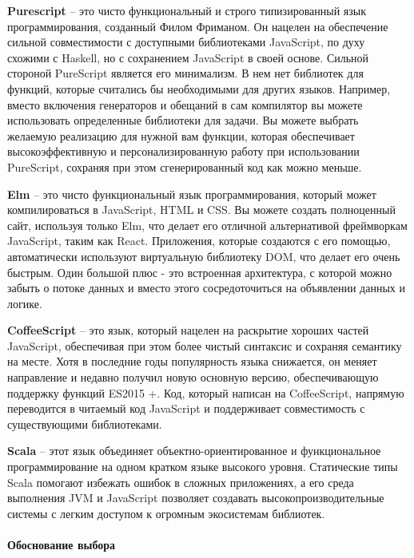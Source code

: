 \documentclass[a4paper,12pt,reqno]{article}
\begin{document}
\textbf{Purescript} -- это чисто функциональный и строго типизированный язык программирования, созданный Филом Фриманом. Он нацелен на обеспечение сильной совместимости с доступными библиотеками JavaScript, по духу схожими с Haskell, но с сохранением JavaScript в своей основе. Сильной стороной PureScript является его минимализм. В нем нет библиотек для функций, которые считались бы необходимыми для других языков. Например, вместо включения генераторов и обещаний в сам компилятор вы можете использовать определенные библиотеки для задачи. Вы можете выбрать желаемую реализацию для нужной вам функции, которая обеспечивает высокоэффективную и персонализированную работу при использовании PureScript, сохраняя при этом сгенерированный код как можно меньше.

\textbf{Elm} -- это чисто функциональный язык программирования, который может компилироваться в JavaScript, HTML и CSS. Вы можете создать полноценный сайт, используя только Elm, что делает его отличной альтернативой фреймворкам JavaScript, таким как React. Приложения, которые создаются с его помощью, автоматически используют виртуальную библиотеку DOM, что делает его очень быстрым. Один большой плюс - это встроенная архитектура, с которой можно забыть о потоке данных и вместо этого сосредоточиться на объявлении данных и логике.

\textbf{CoffeeScript} -- это язык, который нацелен на раскрытие хороших частей JavaScript, обеспечивая при этом более чистый синтаксис и сохраняя семантику на месте. Хотя в последние годы популярность языка снижается, он меняет направление и недавно получил новую основную версию, обеспечивающую поддержку функций ES2015 +. Код, который написан на CoffeeScript, напрямую переводится в читаемый код JavaScript и поддерживает совместимость с существующими библиотеками.

\textbf{Scala} -- этот язык объединяет объектно-ориентированное и функциональное программирование на одном кратком языке высокого уровня. Статические типы Scala помогают избежать ошибок в сложных приложениях, а его среда выполнения JVM и JavaScript позволяет создавать высокопроизводительные системы с легким доступом к огромным экосистемам библиотек.




\paragraph*{Обоснование выбора\\}
\end{document}
